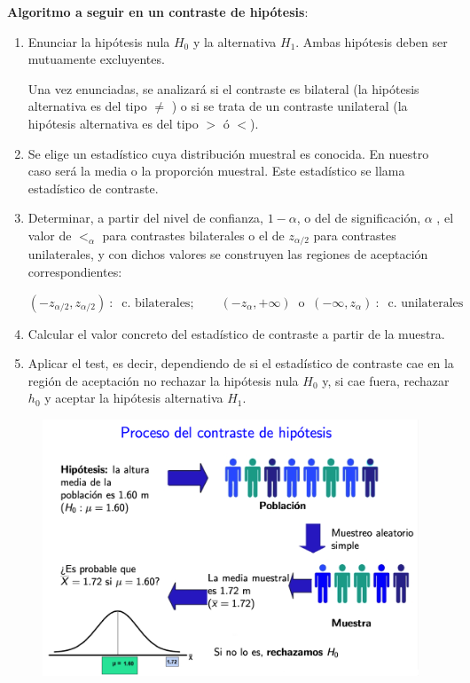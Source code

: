 \begin{definition}

\textbf{Algoritmo a seguir en un contraste de hipótesis}:

\begin{enumerate}
\item  Enunciar la hipótesis nula $H_0$ y la alternativa $H_1$.
Ambas hipótesis deben ser mutuamente  excluyentes.

\vspace{2mm} Una vez enunciadas, se analizará si el contraste es bilateral (la hipótesis alternativa es del tipo $\neq$ ) o si se trata de un contraste unilateral (la hipótesis alternativa es del tipo $> \text{ ó } <$).

\item Se elige un estadístico cuya distribución muestral es conocida. En nuestro caso será la media o la proporción muestral. Este estadístico se llama estadístico de contraste.

\item Determinar, a partir del nivel de confianza, $1-\alpha$, o del de significación, $\alpha$ , el valor de $<_{\alpha}$ para contrastes bilaterales o el de $z_{\alpha/2}$ para contrastes unilaterales, y con dichos valores se construyen las regiones de aceptación correspondientes:

\begin{center} $(-z_{\alpha/2},z_{\alpha/2}) \ : \  \text{ c. bilaterales}; \qquad (-z_{\alpha},+\infty) \ \text{ o } \ (-\infty,z_\alpha) \ : 	\  \text{ c. unilaterales}$ \end{center}

\item Calcular el valor concreto del estadístico de contraste a partir de la muestra.

\item Aplicar el test, es decir, dependiendo de si el estadístico de contraste cae en la región de aceptación no rechazar la hipótesis nula $H_0$ y, si cae fuera, rechazar $h_0$ y aceptar la hipótesis alternativa $H_1$.
	
\end{enumerate}	
\end{definition}

\begin{figure}[H]
	\centering
	\includegraphics[width=1\textwidth]{imagenes/imagenes06/T06IM03.png}
	\end{figure}

